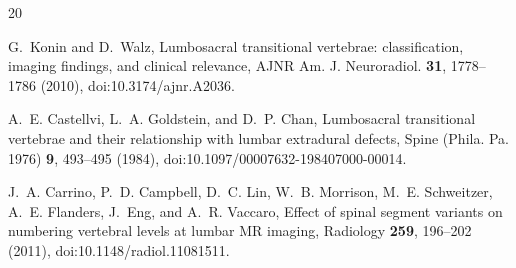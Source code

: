 \documentclass[aapm,mph,amsmath,amssymb,reprint]{revtex4-2}
\newif\ifreview \reviewfalse
\begin{document}
\begin{thebibliography}{20}
%
%
\sloppy

G.~Konin and D.~Walz,
\newblock Lumbosacral transitional vertebrae: classification, imaging findings, and clinical relevance,
\newblock AJNR Am. J. Neuroradiol. {\bf 31}, 1778--1786 (2010),
\newblock doi:10.3174/ajnr.A2036.

A.~E. Castellvi, L.~A. Goldstein, and D.~P. Chan,
\newblock Lumbosacral transitional vertebrae and their relationship with lumbar extradural defects,
\newblock Spine (Phila. Pa. 1976) {\bf 9}, 493--495 (1984),
\newblock doi:10.1097/00007632-198407000-00014.

J.~A. Carrino, P.~D. Campbell, D.~C. Lin, W.~B. Morrison, M.~E. Schweitzer, A.~E. Flanders, J.~Eng, and A.~R. Vaccaro,
\newblock Effect of spinal segment variants on numbering vertebral levels at lumbar {MR} imaging,
\newblock Radiology {\bf 259}, 196--202 (2011),
\newblock doi:10.1148/radiol.11081511.


\end{thebibliography}
\end{document}
